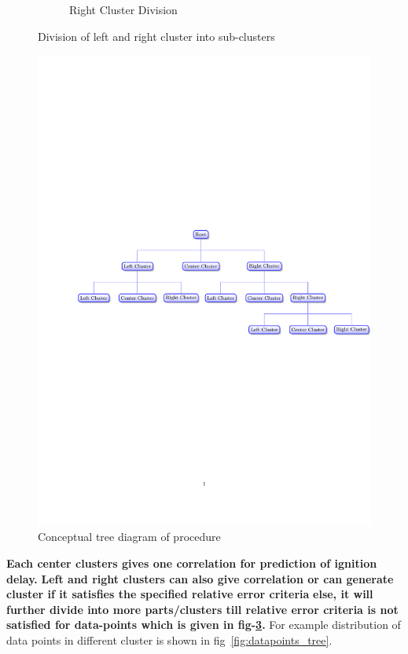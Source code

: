 \documentclass[12pt]{article}
\begin{document}
\begin{figure}[H]
\begin{subfigure}{.5\textwidth}
		\caption{Right Cluster Division}
		\label{fig:cluster2}
	\end{subfigure}
	\caption{Division of left and right cluster into sub-clusters}
	\label{fig:test}
\end{figure}

\begin{figure}[H]
 	\centering
	\includegraphics[trim={2cm 12cm 0 11cm},clip,scale=0.73]{tree.pdf}
 	\caption{Conceptual tree diagram of procedure}
 	\label{fig:tree}
\end{figure}

\textbf{Each center clusters gives one correlation  for prediction of ignition delay.} \textbf{Left and right clusters can also give correlation or can generate cluster if it satisfies the specified relative error criteria} \textbf{else, it will further divide into more parts/clusters till relative error criteria is not satisfied for data-points which is given in fig-\ref{fig:tree}.} For example distribution of data points in different cluster is shown in fig~\ref{fig:datapoints_tree}.
\end{document}
